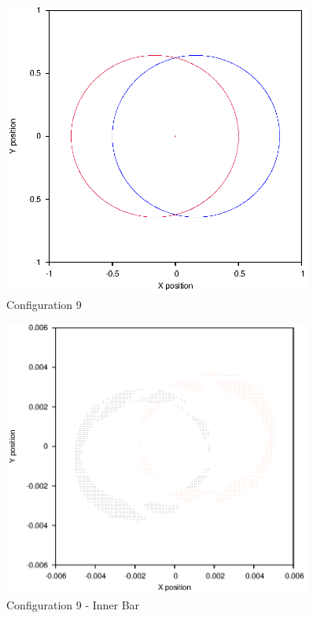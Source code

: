 \documentclass[a4paper,12pt]{article}
\begin{document}
\begin{figure}[H]
\centering
\includegraphics[width=0.9\textwidth]{./2016results/005-58-005-35/Orbit.eps}
\caption{Configuration 9}
\label{fig:config9}
\end{figure}
\begin{figure}[H]
\centering
\includegraphics[width=0.9\textwidth]{./2016results/005-58-005-35/Inner.eps}
\caption{Configuration 9 - Inner Bar}
\label{fig:config9i}
\end{figure}
\end{document}
